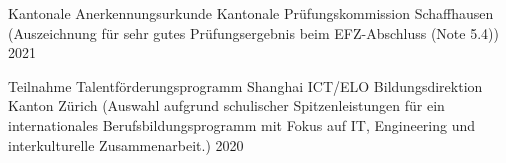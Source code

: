 


\begin{cvhonors}
  \cvhonor
    {Kantonale Anerkennungsurkunde} %
    {Kantonale Prüfungskommission Schaffhausen (Auszeichnung für sehr gutes Prüfungsergebnis beim EFZ-Abschluss (Note 5.4))} %
    {} %
    {2021} %

  \cvhonor
    {Teilnahme Talentförderungsprogramm Shanghai ICT/ELO} %
    {Bildungsdirektion Kanton Zürich (Auswahl aufgrund schulischer Spitzenleistungen für ein internationales Berufsbildungsprogramm mit Fokus auf IT, Engineering und interkulturelle Zusammenarbeit.)} %
    {} %
    {2020} %
\end{cvhonors}

